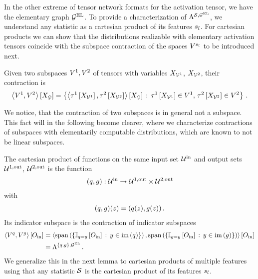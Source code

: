 In the other extreme of tensor network formats for the activation tensor, we have the elementary graph $\mathcal{G}^{\mathrm{EL}}$.
To provide a characterization of $\Lambda^{\mathcal{S},\mathcal{G}^{\mathrm{EL}}}$, we understand any statistic as a cartesian product of its features $s_{l}$.
For cartesian products we can show that the distributions realizable with elementary activation tensors coincide with the subspace contraction of the spaces $V^{s_{l}}$ to be introduced next.

\begin{definition}
    Given two subspaces $V^{1},V^{2}$ of tensors with variables $X_{\mathcal{V}^{1}}$, $X_{\mathcal{V}^{2}}$, their contraction is
    \begin{align*}
        \left\langle V^{1},V^{2}\right\rangle \left[ X_{\tilde{\mathcal{V}}} \right]
        = \left\{ \left\langle \tau^{1}\left[X_{\mathcal{V}^{1}}\right],\tau^{2}\left[X_{\mathcal{V}^{2}}\right]\right\rangle \left[ X_{\tilde{\mathcal{V}}} \right]
        \, : \, \tau^{1}\left[X_{\mathcal{V}^{1}}\right]\in V^{1}, \, \tau^{2}\left[X_{\mathcal{V}^{2}}\right]\in V^{2} \right\} \, .
    \end{align*}
\end{definition}

We notice, that the contraction of two subspaces is in general not a subspace.
This fact will in the following become clearer, where we characterize contractions of subspaces with elementarily computable distributions, which are known to not be linear subspaces.

The cartesian product of functions on the same input set $\mathcal{U}^{\mathrm{in}}$ and output sets $\mathcal{U}^{1,\mathrm{out}}$, $\mathcal{U}^{2,\mathrm{out}}$ is the function
\begin{align*}
(q,g)
    : \mathcal{U}^{\mathrm{in}} \rightarrow \mathcal{U}^{1,\mathrm{out}} \times \mathcal{U}^{2,\mathrm{out}}
\end{align*}
with
\begin{align*}
(q,g)(z)
    = (q(z),g(z)) \, .
\end{align*}
Its indicator subspace is the contraction of indicator subspaces
\begin{align*}
    \left\langle V^{q},V^{g}\right\rangle \left[ O_{\mathrm{in}} \right]
    & = \left\langle 
        \mathrm{span}\left(\{\mathbb{I}_{q=y}\left[O_{\mathrm{in}}\right] \,:\, y\in\mathrm{im}\left(q\right)\}\right),
        \mathrm{span}\left(\{\mathbb{I}_{g=y}\left[O_{\mathrm{in}}\right] \,:\, y\in\mathrm{im}\left(g\right)\}\right)
    \right\rangle \left[ O_{\mathrm{in}} \right] \\
    & = \Lambda^{\{q, g\},\mathcal{G}^{\mathrm{EL}}} \, .
\end{align*}
We generalize this in the next lemma to cartesian products of multiple features using that any statistic $\mathcal{S}$ is the cartesian product of its features $s_{l}$.

